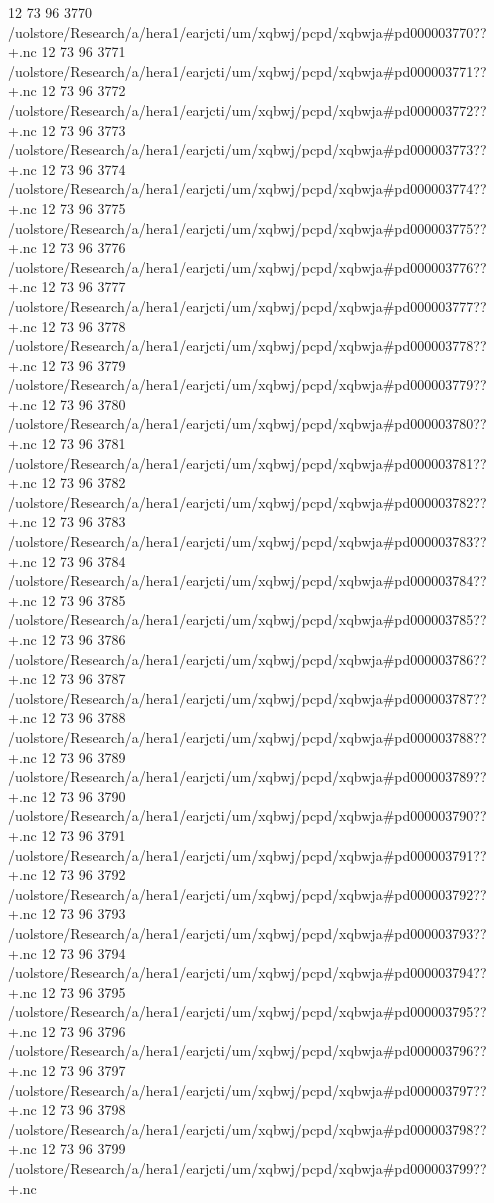 12 73 96
3770
/uolstore/Research/a/hera1/earjcti/um/xqbwj/pcpd/xqbwja#pd000003770??+.nc
12 73 96
3771
/uolstore/Research/a/hera1/earjcti/um/xqbwj/pcpd/xqbwja#pd000003771??+.nc
12 73 96
3772
/uolstore/Research/a/hera1/earjcti/um/xqbwj/pcpd/xqbwja#pd000003772??+.nc
12 73 96
3773
/uolstore/Research/a/hera1/earjcti/um/xqbwj/pcpd/xqbwja#pd000003773??+.nc
12 73 96
3774
/uolstore/Research/a/hera1/earjcti/um/xqbwj/pcpd/xqbwja#pd000003774??+.nc
12 73 96
3775
/uolstore/Research/a/hera1/earjcti/um/xqbwj/pcpd/xqbwja#pd000003775??+.nc
12 73 96
3776
/uolstore/Research/a/hera1/earjcti/um/xqbwj/pcpd/xqbwja#pd000003776??+.nc
12 73 96
3777
/uolstore/Research/a/hera1/earjcti/um/xqbwj/pcpd/xqbwja#pd000003777??+.nc
12 73 96
3778
/uolstore/Research/a/hera1/earjcti/um/xqbwj/pcpd/xqbwja#pd000003778??+.nc
12 73 96
3779
/uolstore/Research/a/hera1/earjcti/um/xqbwj/pcpd/xqbwja#pd000003779??+.nc
12 73 96
3780
/uolstore/Research/a/hera1/earjcti/um/xqbwj/pcpd/xqbwja#pd000003780??+.nc
12 73 96
3781
/uolstore/Research/a/hera1/earjcti/um/xqbwj/pcpd/xqbwja#pd000003781??+.nc
12 73 96
3782
/uolstore/Research/a/hera1/earjcti/um/xqbwj/pcpd/xqbwja#pd000003782??+.nc
12 73 96
3783
/uolstore/Research/a/hera1/earjcti/um/xqbwj/pcpd/xqbwja#pd000003783??+.nc
12 73 96
3784
/uolstore/Research/a/hera1/earjcti/um/xqbwj/pcpd/xqbwja#pd000003784??+.nc
12 73 96
3785
/uolstore/Research/a/hera1/earjcti/um/xqbwj/pcpd/xqbwja#pd000003785??+.nc
12 73 96
3786
/uolstore/Research/a/hera1/earjcti/um/xqbwj/pcpd/xqbwja#pd000003786??+.nc
12 73 96
3787
/uolstore/Research/a/hera1/earjcti/um/xqbwj/pcpd/xqbwja#pd000003787??+.nc
12 73 96
3788
/uolstore/Research/a/hera1/earjcti/um/xqbwj/pcpd/xqbwja#pd000003788??+.nc
12 73 96
3789
/uolstore/Research/a/hera1/earjcti/um/xqbwj/pcpd/xqbwja#pd000003789??+.nc
12 73 96
3790
/uolstore/Research/a/hera1/earjcti/um/xqbwj/pcpd/xqbwja#pd000003790??+.nc
12 73 96
3791
/uolstore/Research/a/hera1/earjcti/um/xqbwj/pcpd/xqbwja#pd000003791??+.nc
12 73 96
3792
/uolstore/Research/a/hera1/earjcti/um/xqbwj/pcpd/xqbwja#pd000003792??+.nc
12 73 96
3793
/uolstore/Research/a/hera1/earjcti/um/xqbwj/pcpd/xqbwja#pd000003793??+.nc
12 73 96
3794
/uolstore/Research/a/hera1/earjcti/um/xqbwj/pcpd/xqbwja#pd000003794??+.nc
12 73 96
3795
/uolstore/Research/a/hera1/earjcti/um/xqbwj/pcpd/xqbwja#pd000003795??+.nc
12 73 96
3796
/uolstore/Research/a/hera1/earjcti/um/xqbwj/pcpd/xqbwja#pd000003796??+.nc
12 73 96
3797
/uolstore/Research/a/hera1/earjcti/um/xqbwj/pcpd/xqbwja#pd000003797??+.nc
12 73 96
3798
/uolstore/Research/a/hera1/earjcti/um/xqbwj/pcpd/xqbwja#pd000003798??+.nc
12 73 96
3799
/uolstore/Research/a/hera1/earjcti/um/xqbwj/pcpd/xqbwja#pd000003799??+.nc
